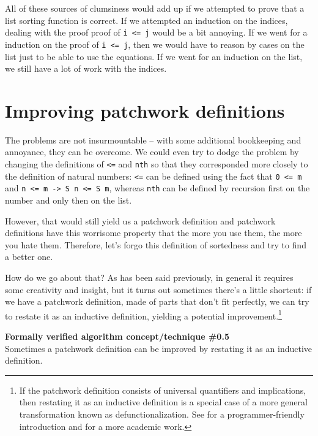 \documentclass[declaration,mgr,english,shortabstract]{iithesis}
\newcommand{\m}[1]{\texttt{#1}}
\begin{document}
All of these sources of clumsiness would add up if we attempted to prove that a list sorting function is correct. If we attempted an induction on the indices, dealing with the proof proof of \m{i <= j} would be a bit annoying. If we went for a induction on the proof of \m{i <= j}, then we would have to reason by cases on the list just to be able to use the equations. If we went for an induction on the list, we still have a lot of work with the indices.

\section{Improving patchwork definitions} \label{improvingpatchwork}

The problems are not insurmountable -- with some additional bookkeeping and annoyance, they can be overcome. We could even try to dodge the problem by changing the definitions of \m{<=} and \m{nth} so that they corresponded more closely to the definition of natural numbers: \m{<=} can be defined using the fact that \m{0 <= m} and \m{n <= m -> S n <= S m}, whereas \m{nth} can be defined by recursion first on the number and only then on the list.

However, that would still yield us a patchwork definition and patchwork definitions have this worrisome property that the more you use them, the more you hate them. Therefore, let's forgo this definition of sortedness and try to find a better one.

How do we go about that? As has been said previously, in general it requires some creativity and insight, but it turns out sometimes there's a little shortcut: if we have a patchwork definition, made of parts that don't fit perfectly, we can try to restate it as an inductive definition, yielding a potential improvement.\footnote{If the patchwork definition consists of universal quantifiers and implications, then restating it as an inductive definition is a special case of a more general transformation known as defunctionalization. See \cite{DefunctionalizationLight} for a programmer-friendly introduction and \cite{DefunctionalizationSerious} for a more academic work.}

\begin{center}
    \textbf{Formally verified algorithm concept/technique \#0.5} \\
    Sometimes a patchwork definition can be improved by restating it as an inductive definition.
\end{center}
\end{document}
